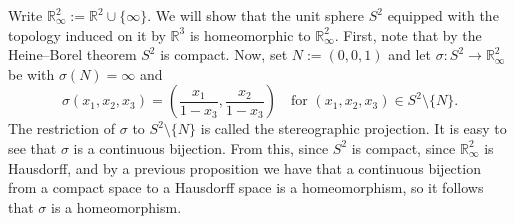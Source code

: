 \documentclass[11pt,a4paper]{article}
\theoremstyle{definition}
\theoremstyle{plain}
\newcommand{\R}{\mathbb{R}}
\begin{document}
  Write $\R^2_\infty := \R^2 \cup \{\infty\}$.
  We will show that the unit sphere $S^2$ equipped with the topology
  induced on it by $\R^3$ is homeomorphic to $\R^2_\infty$.
  First, note that by the Heine--Borel theorem $S^2$ is compact.
  Now, set $N := (0,0,1)$ and let $\sigma \colon S^2 \to \R^2_\infty$ be
  with $\sigma(N) = \infty$ and
  \[
    \sigma(x_1,x_2,x_3) =
    \left(\frac{x_1}{1 - x_3}, \frac{x_2}{1 - x_3}\right) \quad
    \text{for $(x_1,x_2,x_3) \in S^2 \setminus \{N\}$}.
  \]
  The restriction of $\sigma$ to $S^2 \setminus \{N\}$ is called the
  stereographic projection.
  It is easy to see that $\sigma$ is a continuous bijection.
  From this, since $S^2$ is compact,
  since $\R^2_\infty$ is Hausdorff,
  and by a previous proposition we have that a continuous bijection from
  a compact space to a Hausdorff space is a homeomorphism,
  so it follows that $\sigma$ is a homeomorphism.
  
  
\end{document}
